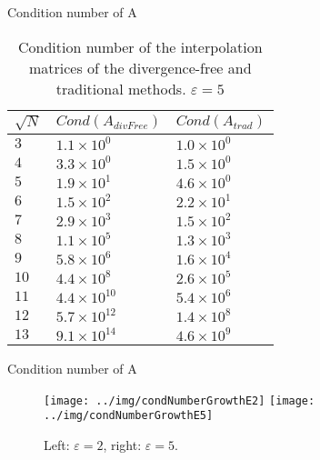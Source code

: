 \documentclass{beamer}
\begin{document}
\begin{frame}{Condition number of A}
  \begin{table}[hptb]
    \begin{center}
      \begin{tabular}{l||l|l}
        \multicolumn{1}{c||}{$\sqrt{N}$} & 
	\multicolumn{1}{c|}{$Cond(A_{divFree})$} & 
	\multicolumn{1}{c}{$Cond(A_{trad})$} \\
        \hline \hline
        $3$ & $1.1\times 10^{0}$ & $1.0\times 10^{0}$ \\
        $4$ & $3.3\times 10^{0}$ & $1.5\times 10^{0}$ \\
        $5$ & $1.9\times 10^{1}$ & $4.6\times 10^{0}$ \\
        $6$ & $1.5\times 10^{2}$ & $2.2\times 10^{1}$ \\
        $7$ & $2.9\times 10^{3}$ & $1.5\times 10^{2}$ \\
        $8$ & $1.1\times 10^{5}$ & $1.3\times 10^{3}$ \\
        $9$ & $5.8\times 10^{6}$ & $1.6\times 10^{4}$ \\
        $10$ & $4.4\times 10^{8}$ & $2.6\times 10^{5}$ \\
        $11$ & $4.4\times 10^{10}$ & $5.4\times 10^{6}$ \\
        $12$ & $5.7\times 10^{12}$ & $1.4\times 10^{8}$ \\
        $13$ & $9.1\times 10^{14}$ & $4.6\times 10^{9}$ \\
    \end{tabular}
    \end{center}
    \caption{Condition number of the interpolation matrices of the 
    divergence-free and traditional methods. $\varepsilon = 5$}
  \end{table}
\end{frame}

\begin{frame}{Condition number of A}
  \begin{figure}[htb]
    \begin{center}
      \texttt{[image: ../img/condNumberGrowthE2]}
      \texttt{[image: ../img/condNumberGrowthE5]}
    \end{center}
    \caption{Left: $\varepsilon = 2$, right: $\varepsilon=5$.}
  \end{figure}
\end{frame}
\end{document}
